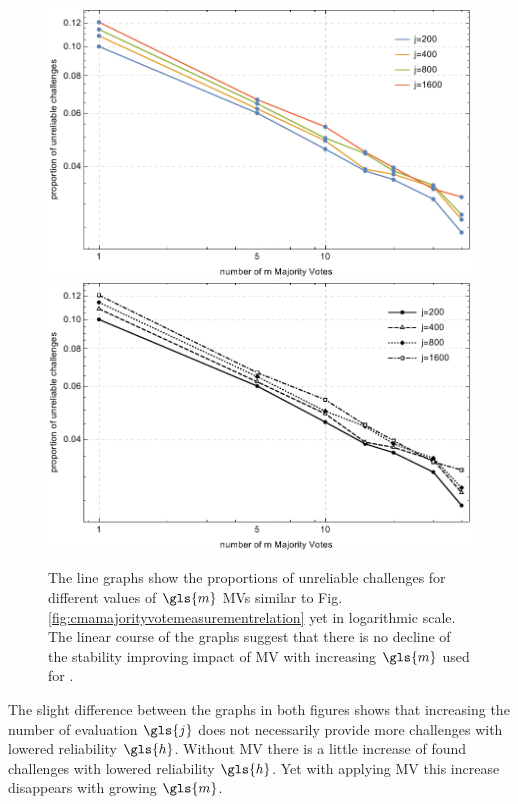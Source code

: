 \begin{figure}[ht]
\ifx{}\undefined
{}
\else
	\if{}
	\centering
	\includegraphics[width=1.00\textwidth]{images/mv-measurements-unstableChallenges_loglog.pdf}
	\else
	\includegraphics[width=1.00\textwidth]{images/mv-measurements-unstableChallenges_loglog_mono.pdf}
	\fi
\fi
\caption[Proportion of unreliable challenges logarithmic]{The line graphs show the proportions of unreliable challenges for different values of $\gls{m}$ \acp{MV} similar to Fig. \ref{fig:cmamajorityvotemeasurementrelation} yet in logarithmic scale. The linear course of the graphs suggest that there is no decline of the stability improving impact of \ac{MV} with increasing $\gls{m}$ used for \mpufs.}
\label{fig:cmamajorityvotemeasurementrelationloglog}
\end{figure}

The slight difference between the graphs in both figures shows that increasing the number of evaluation $\gls{j}$ does not necessarily provide more challenges with lowered reliability $\gls{h}$.
Without \ac{MV} there is a little increase of found challenges with lowered reliability $\gls{h}$.
Yet with applying \ac{MV} this increase disappears with growing $\gls{m}$.

